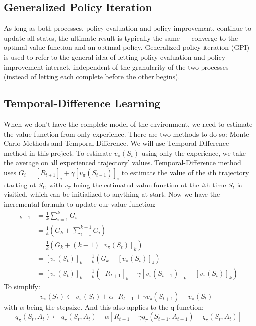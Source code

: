 \documentclass[11pt]{article}
\begin{document}
\subsection{Generalized Policy Iteration}
As long as both processes, policy evaluation and policy improvement, continue
to update all states, the ultimate result is typically the same --- converge to
the optimal value function and an optimal policy.
\vspace{3mm}\newline Generalized policy iteration (GPI) is used to refer to the
general idea of letting policy evaluation and policy improvement interact, 
independent of the granularity of the two processes (instead of letting each
complete before the other begins).

\subsection{Temporal-Difference Learning}
When we don't have the complete model of the environment, we need to estimate 
the value function from only experience. There are two methods to do so: 
Monte Carlo Methods and Temporal-Difference. We will use Temporal-Difference
method in this project.
\vspace{3mm}\newline To estimate \(v_\pi(S_t)\) using only the experience, we 
take the average on all experienced trajectory' values. Temporal-Difference
method uses \(G_i = [R_{t+1}]_i+\gamma [v_\pi(S_{t+1})]_i\) to estimate the 
value of the \(i\)th trajectory starting at \(S_t\), with \(v_\pi\) being the 
estimated value function at the \(i\)th time \(S_t\) is visitied, which can be 
initialized to anything at start. Now we have the incremental formula to update
our value function:
\begin{align*}
    [v_\pi(S_t)]_{k+1} &= \frac{1}{k}\sum_{i=1}^{k} G_i\\
               &= \frac{1}{k}\left(G_k + \sum_{i=1}^{k-1} G_i\right)\\
               &= \frac{1}{k}\left(G_k + (k-1)[v_\pi(S_t)]_{k}\right)\\
               &= [v_\pi(S_t)]_k + \frac{1}{k}(G_k-[v_\pi(S_t)]_k)\\
               &= [v_\pi(S_t)]_k + \frac{1}{k}
               ([R_{t+1}]_k+\gamma [v_\pi(S_{t+1})]_k-[v_\pi(S_t)]_k)
\end{align*}
To simplify:
\[v_\pi(S_t)\longleftarrow v_\pi(S_t)+\alpha
[R_{t+1}+\gamma v_\pi(S_{t+1})-v_\pi(S_t)]\]
with \(\alpha\) being the stepsize. And this also applies to the q function:
\[q_\pi(S_t, A_t)\longleftarrow q_\pi(S_t, A_t)+\alpha
[R_{t+1}+\gamma q_\pi(S_{t+1}, A_{t+1})-q_\pi(S_t, A_t)]\]
\end{document}
